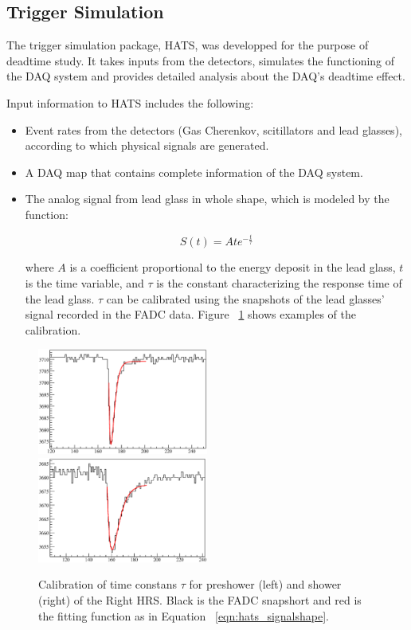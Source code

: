 \subsection{Trigger Simulation}\label{sec:hats}

The trigger simulation package, HATS, was developped for the purpose of deadtime study. It takes inputs from the detectors, simulates the functioning of the DAQ system and provides detailed analysis about the DAQ's deadtime effect.

Input information to HATS includes the following:

\begin{itemize}

\item Event rates from the detectors (Gas Cherenkov, scitillators and lead glasses), according to which physical signals are generated.

\item A DAQ map that contains complete information of the DAQ system.

\item The analog signal from lead glass in whole shape, which is modeled by the function:

\begin{equation}\label{eqn:hats_signalshape}
S(t) = A t e^{-\frac{t}{\tau}}
\end{equation}

where $A$ is a coefficient proportional to the energy deposit in the lead glass, $t$ is the time variable, and $\tau$ is the constant characterizing the response time of the lead glass. $\tau$ can be calibrated using the snapshots of the lead  glasses' signal recorded in the FADC data. Figure ~\ref{fig:hats_calib} shows examples of the calibration.

\end{itemize}

\begin{figure}[!ht]
\includegraphics[width=0.5\textwidth,angle=0]{DW/pscalib.eps}
\includegraphics[width=0.5\textwidth,angle=0]{DW/shcalib.eps}
\caption{Calibration of time constans $\tau$ for preshower (left) and shower (right) of the Right HRS. Black is the FADC snapshort and red is the fitting function as in Equation ~\ref{eqn:hats_signalshape}. }\label{fig:hats_calib}
\end{figure}


